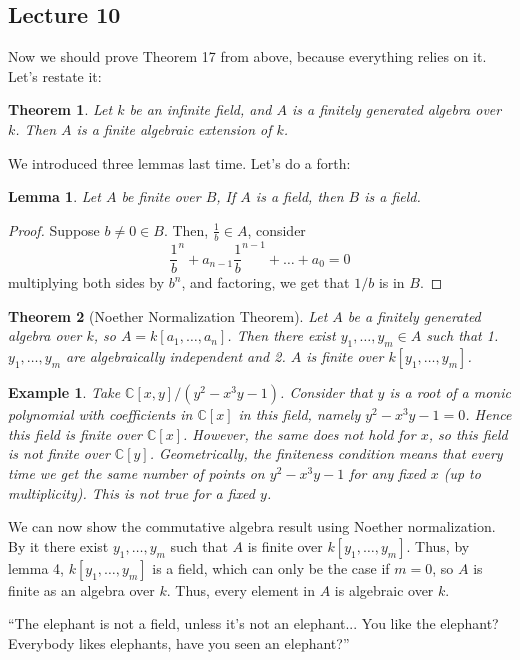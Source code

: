 \documentclass[12pt]{article}
\newcommand{\C}{\mathbb{C}}
\newtheorem{example}[]{Example}
\newtheorem{theorem}{Theorem}
\newtheorem{lemma}{Lemma}
\begin{document}
    \subsection{Lecture 10}
    Now we should prove Theorem 17 from above, because everything relies on it. Let's restate it: 
    \begin{theorem}
        Let $k$ be an infinite field, and $A$ is a finitely generated algebra over $k$. Then $A$ is a finite algebraic extension of $k$. 
    \end{theorem}
    We introduced three lemmas last time. Let's do a forth:
    \begin{lemma}
        Let $A$ be finite over $B$, If $A$ is a field, then $B$ is a field. 
    \end{lemma}
    \begin{proof}
        Suppose $b \neq 0 \in B$. Then, $\frac{1}{b} \in A$, consider 
        $$\frac{1}{b}^n + a_{n-1}\frac{1}{b}^{n-1} + \dots + a_0 = 0$$
        multiplying both sides by $b^n$, and factoring, we get that $1/b$ is in $B$. 
    \end{proof}
    \begin{theorem}
        [Noether Normalization Theorem] Let $A$ be a finitely generated algebra over $k$, so $A = k[a_1, \dots, a_n]$. Then there exist $y_1, \dots, y_m \in A$ such that 1. $y_1, \dots, y_m$ are algebraically independent and 2. $A$ is finite over $k[y_1, \dots, y_m]$. 
    \end{theorem}
    \begin{example}
        Take $\C[x, y]/(y^2 - x^3y - 1)$. Consider that $y$ is a root of a monic polynomial with coefficients in $\C[x]$ in this field, namely $y^2 - x^3y - 1 = 0$. Hence this field is finite over $\C[x]$. However, the same does not hold for $x$, so this field is not finite over $\C[y]$. Geometrically, the finiteness condition means that every time we get the same number of points on $y^2 - x^3y - 1$ for any fixed $x$ (up to multiplicity). This is not true for a fixed $y$. 
    \end{example}
    We can now show the commutative algebra result using Noether normalization. By it there exist $y_1, \dots, y_m$ such that $A$ is finite over $k[y_1, \dots, y_m]$. Thus, by lemma 4, $k[y_1, \dots, y_m]$ is a field, which can only be the case if $m = 0$, so $A$ is finite as an algebra over $k$. Thus, every element in $A$ is algebraic over $k$. \par 
    ``The elephant is not a field, unless it's not an elephant... You like the elephant? Everybody likes elephants, have you seen an elephant?'' \par 
\end{document}
